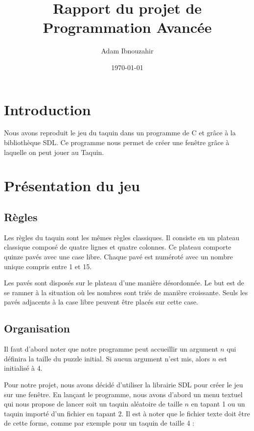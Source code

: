 \documentclass[11pt]{article}
\author{Adam Ibnouzahir}
\date{\today}
\title{Rapport du projet de Programmation Avancée}
\begin{document}
\maketitle
\tableofcontents


\section{Introduction}
\label{sec:orgb28f1eb}

Nous avons reproduit le jeu du taquin dans un programme de C et grâce à la bibliothèque SDL. Ce programme nous permet de créer une fenêtre grâce à laquelle on peut jouer au Taquin.

\section{Présentation du jeu}
\label{sec:orgb7abdb1}

\subsection{Règles}
\label{sec:org29dc8cf}

Les règles du taquin sont les mêmes règles classiques. Il consiste en un plateau classique composé de quatre lignes et quatre colonnes. Ce plateau comporte quinze pavés avec une case libre. Chaque pavé est numéroté avec un nombre unique compris entre 1 et 15.

Les pavés sont disposés sur le plateau d'une manière désordonnée. Le but est de se ramner à la situation où les nombres sont triés de manière croissante. Seuls les pavés adjacents à la case libre peuvent être placés sur cette case.

\subsection{Organisation}
\label{sec:org167c8de}

Il faut d'abord noter que notre programme peut accueillir un argument \(n\) qui définira la taille du puzzle initial. Si aucun argument n'est mis, alors \(n\) est initialisé à 4.

Pour notre projet, nous avons décidé d'utiliser la librairie SDL pour créer le jeu sur une fenêtre. En lançant le programme, nous avons d'abord un menu textuel qui nous propose de lancer soit un taquin aléatoire de taille \(n\) en tapant 1 ou un taquin importé d'un fichier en tapant 2. Il est à noter que le fichier texte doit être de cette forme, comme par exemple pour un taquin de taille 4 :
\end{document}

